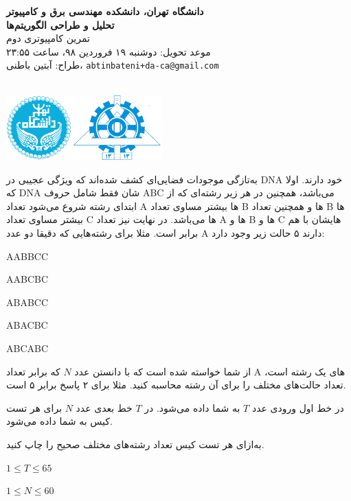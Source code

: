 \documentclass[11.5pt,a4paper,oneside]{article}
\makeatletter
\renewcommand{\contestname}{
دانشگاه تهران، دانشکده مهندسی برق و کامپیوتر \\
تحلیل و طراحی الگوریتم‌ها \\
}
\renewcommand{\contestauthor}{
تمرین کامپیوتری دوم \\ موعد تحویل: دوشنبه ۱۹ فروردین ۹۸، ساعت ۲۳:۵۵ \\ طراح:‌ آبتین باطنی،
\texttt{abtinbateni+da-ca@gmail.com}
}
\makeatother
\begin{document}
{\noindent \Large \bf \contestname}
{\contestauthor}

\begin{flushleft}
\nothing\\[-3.2cm]
\includegraphics[height=2.5cm]{../../../../static/pics/ut-eng.png}
\end{flushleft}

\def\problemCode{DNA}
\def\problemEnglishTitle{Foreign DNA}
\def\problemFarsiTitle{دی‌ان‌ای فضایی}
\def\timeLimit{$2$ \second}
\def\memLimit{$256$ \megabytes}
\begin{problem}
به‌تازگی موجودات فضایی‌ای کشف شده‌اند که ویژگی عجیبی در DNA خود دارند. اولا که DNA شان فقط شامل حروف ABC می‌باشد، همچنین در هر زیر رشته‌ای که از ابتدای رشته شروع می‌شود تعداد A ها بیشتر مساوی تعداد B ها و همچنین تعداد B ها بیشتر مساوی تعداد C ها می‌باشد. در نهایت نیز تعداد A ها و B ها و C هایشان با هم برابر است. مثلا برای رشته‌هایی که دقیقا دو عدد A دارند ۵ حالت زیر وجود دارد:
\begin{shortitems}
\item
AABBCC
\item
AABCBC
\item
ABABCC
\item
ABACBC
\item
ABCABC
\end{shortitems}
از شما خواسته شده است که با دانستن عدد
$N$
که برابر تعداد A های یک رشته است، تعداد حالت‌های مختلف را برای آن رشته محاسبه کنید. مثلا برای ۲ پاسخ برابر ۵ است.

در خط اول ورودی عدد $T$ به شما داده می‌شود. در $T$ خط بعدی عدد $N$ برای هر تست کیس به شما داده می‌شود.

\outputDescription
به‌ازای هر تست کیس تعداد رشته‌های مختلف صحیح را چاپ کنید.

\constraints
\begin{shortitems}
	\item $1 \le T \le 65$
	\item $1 \le N \le 60$
\end{shortitems}

\sampleIO

\begin{example}
%
\end{example}

\end{problem}
\end{document}
